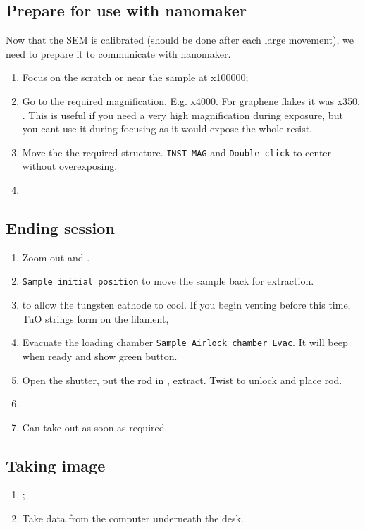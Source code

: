   \subsection{Prepare for use with nanomaker}
  Now that the SEM is calibrated (should be done after each large movement), we need to prepare it to communicate with nanomaker.
  
  \begin{enumerate}
  	\item Focus on the scratch or near the sample at x100000;
  	\item Go to the required magnification. E.g. x4000. For graphene flakes it was x350. . This is useful if you need a very high magnification during exposure, but you cant use it during focusing as it would expose the whole resist.
  	\item Move the the required structure. \texttt{INST MAG} and  \texttt{Double click} to center without overexposing.
  	\item {}
  \end{enumerate}
  	
  \subsection{Ending session}
  \begin{enumerate}
  	\item Zoom out and .
  	\item \texttt{Sample \ra initial position} to move the sample back for extraction.
  	\item {} to allow the tungsten cathode to cool. If you begin venting before this time, TuO strings form on the filament,
  	\item Evacuate the loading chamber \texttt{Sample \ra Airlock chamber \ra Evac}. It will beep when ready and show green button.
  	\item Open the shutter, put the rod in , extract. Twist to unlock and place rod.
  	\item {}
  	\item Can take out as soon as required.
  \end{enumerate}


 \subsection{Taking image}
 	\begin{enumerate}
 		\item {} \ra {} \ra {};
 		\item Take data from the computer underneath the desk.
 	\end{enumerate}
  \newpage

